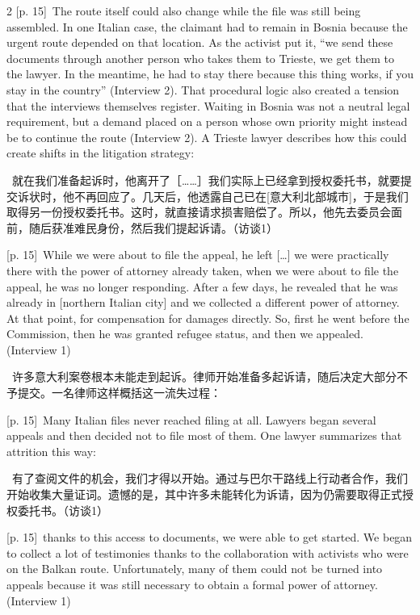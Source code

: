 \documentclass[10pt,a4paper]{article}
\begin{document}
\begin{paracol}{2}
\switchcolumn
{\scriptsize\color{gray} [p. 15]}\ The route itself could also change while the file was still being assembled. In one Italian case, the claimant had to remain in Bosnia because the urgent route depended on that location. As the activist put it, “we send these documents through another person who takes them to Trieste, we get them to the lawyer. In the meantime, he had to stay there because this thing works, if you stay in the country” (Interview 2). That procedural logic also created a tension that the interviews themselves register. Waiting in Bosnia was not a neutral legal requirement, but a demand placed on a person whose own priority might instead be to continue the route (Interview 2). A Trieste lawyer describes how this could create shifts in the litigation strategy:\par
\switchcolumn*
{\scriptsize\color{gray} [p. 15]}\ 就在我们准备起诉时，他离开了［……］我们实际上已经拿到授权委托书，就要提交诉状时，他不再回应了。几天后，他透露自己已在[意大利北部城市]，于是我们取得另一份授权委托书。这时，就直接请求损害赔偿了。所以，他先去委员会面前，随后获准难民身份，然后我们提起诉请。（访谈1）\par
\switchcolumn
{\scriptsize\color{gray} [p. 15]}\ While we were about to file the appeal, he left […] we were practically there with the power of attorney already taken, when we were about to file the appeal, he was no longer responding. After a few days, he revealed that he was already in [northern Italian city] and we collected a different power of attorney. At that point, for compensation for damages directly. So, first he went before the Commission, then he was granted refugee status, and then we appealed. (Interview 1)\par
\switchcolumn*
{\scriptsize\color{gray} [p. 15]}\ 许多意大利案卷根本未能走到起诉。律师开始准备多起诉请，随后决定大部分不予提交。一名律师这样概括这一流失过程：\par
\switchcolumn
{\scriptsize\color{gray} [p. 15]}\ Many Italian files never reached filing at all. Lawyers began several appeals and then decided not to file most of them. One lawyer summarizes that attrition this way:\par
\switchcolumn*
{\scriptsize\color{gray} [p. 15]}\ 有了查阅文件的机会，我们才得以开始。通过与巴尔干路线上行动者合作，我们开始收集大量证词。遗憾的是，其中许多未能转化为诉请，因为仍需要取得正式授权委托书。（访谈1）\par
\switchcolumn
{\scriptsize\color{gray} [p. 15]}\ thanks to this access to documents, we were able to get started. We began to collect a lot of testimonies thanks to the collaboration with activists who were on the Balkan route. Unfortunately, many of them could not be turned into appeals because it was still necessary to obtain a formal power of attorney. (Interview 1)\par

\end{paracol}
\end{document}
